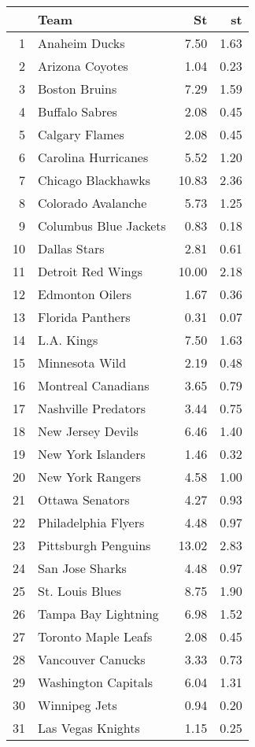 \begin{table}[ht]
\centering
\begin{tabular}{rlrr}
  \hline
 & Team & St & st \\ 
  \hline
1 & Anaheim Ducks & 7.50 & 1.63 \\ 
  2 & Arizona Coyotes & 1.04 & 0.23 \\ 
  3 & Boston Bruins & 7.29 & 1.59 \\ 
  4 & Buffalo Sabres & 2.08 & 0.45 \\ 
  5 & Calgary Flames & 2.08 & 0.45 \\ 
  6 & Carolina Hurricanes & 5.52 & 1.20 \\ 
  7 & Chicago Blackhawks & 10.83 & 2.36 \\ 
  8 & Colorado Avalanche & 5.73 & 1.25 \\ 
  9 & Columbus Blue Jackets & 0.83 & 0.18 \\ 
  10 & Dallas Stars & 2.81 & 0.61 \\ 
  11 & Detroit Red Wings & 10.00 & 2.18 \\ 
  12 & Edmonton Oilers & 1.67 & 0.36 \\ 
  13 & Florida Panthers & 0.31 & 0.07 \\ 
  14 & L.A. Kings & 7.50 & 1.63 \\ 
  15 & Minnesota Wild & 2.19 & 0.48 \\ 
  16 & Montreal Canadians & 3.65 & 0.79 \\ 
  17 & Nashville Predators & 3.44 & 0.75 \\ 
  18 & New Jersey Devils & 6.46 & 1.40 \\ 
  19 & New York Islanders & 1.46 & 0.32 \\ 
  20 & New York Rangers & 4.58 & 1.00 \\ 
  21 & Ottawa Senators & 4.27 & 0.93 \\ 
  22 & Philadelphia Flyers & 4.48 & 0.97 \\ 
  23 & Pittsburgh Penguins & 13.02 & 2.83 \\ 
  24 & San Jose Sharks & 4.48 & 0.97 \\ 
  25 & St. Louis Blues & 8.75 & 1.90 \\ 
  26 & Tampa Bay Lightning & 6.98 & 1.52 \\ 
  27 & Toronto Maple Leafs & 2.08 & 0.45 \\ 
  28 & Vancouver Canucks & 3.33 & 0.73 \\ 
  29 & Washington Capitals & 6.04 & 1.31 \\ 
  30 & Winnipeg Jets & 0.94 & 0.20 \\ 
  31 & Las Vegas Knights & 1.15 & 0.25 \\ 
   \hline
\end{tabular}
\end{table}
